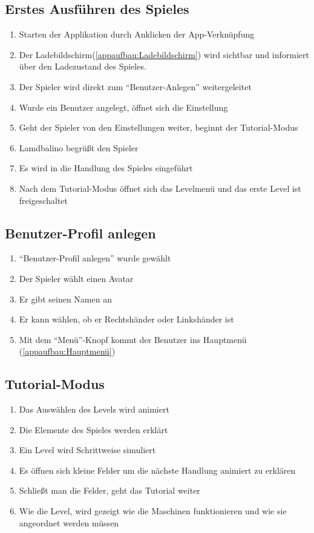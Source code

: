\documentclass{scrartcl}
\begin{document}
\subsection{Erstes Ausführen des Spieles} \label{szenarien:first_run}
	\begin{enumerate}
		\item Starten der Applikation durch Anklicken der App-Verknüpfung
		\item Der Ladebildschirm(\ref{appaufbau:Ladebildschirm}) wird sichtbar und informiert über den Ladezustand des Spieles.
		\item Der Spieler wird direkt zum "`Benutzer-Anlegen"'  weitergeleitet
		\item Wurde ein Benutzer angelegt, öffnet sich die Einstellung
		\item Geht der Spieler von den Einstellungen weiter, beginnt der Tutorial-Modus
		\item Lamdbalino begrüßt den Spieler
		\item Es wird in die Handlung des Spieles eingeführt
		\item Nach dem Tutorial-Modus öffnet sich das Levelmenü und das erste Level ist freigeschaltet 
	\end{enumerate}
	
\subsection{Benutzer-Profil anlegen} \label{szenarien:ProfilAnlegen}
	\begin{enumerate}
		\item \enquote{Benutzer-Profil anlegen} wurde gewählt
		\item Der Spieler wählt einen Avatar
		\item Er gibt seinen Namen an
		\item Er kann wählen, ob er Rechtshänder oder Linkshänder ist
		\item Mit dem \enquote{Menü}-Knopf kommt der Benutzer ins Hauptmenü (\ref{appaufbau:Hauptmenü})
	\end{enumerate}	
	
\subsection{Tutorial-Modus} \label{szenarien:tutorial_mode}
	\begin{enumerate}
		\item Das Auswählen des Levels wird animiert
		\item Die Elemente des Spieles werden erklärt
		\item Ein Level wird Schrittweise simuliert
		\item Es öffnen sich kleine Felder um die nächste Handlung animiert zu erklären
		\item Schließt man die Felder, geht das Tutorial weiter
		\item Wie die Level, wird gezeigt wie die Maschinen funktionieren und wie sie angeordnet werden müssen
	\end{enumerate}
	
\end{document}
